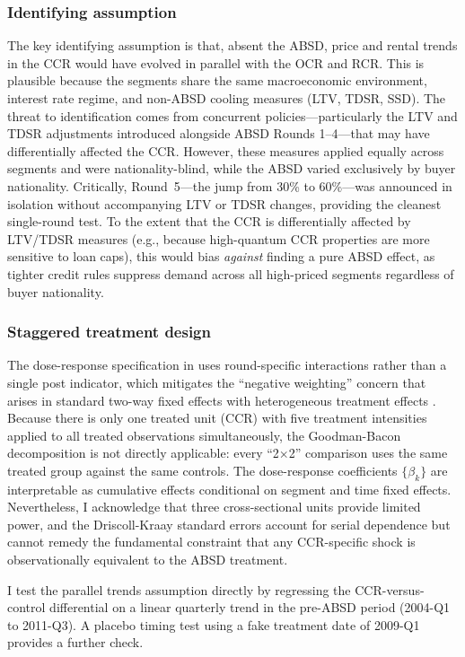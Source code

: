 \documentclass[12pt]{article}
\begin{document}
\subsubsection*{Identifying assumption} The key identifying assumption is that, absent the ABSD, price and rental trends in the CCR would have evolved in parallel with the OCR and RCR. This is plausible because the segments share the same macroeconomic environment, interest rate regime, and non-ABSD cooling measures (LTV, TDSR, SSD). The threat to identification comes from concurrent policies---particularly the LTV and TDSR adjustments introduced alongside ABSD Rounds 1--4---that may have differentially affected the CCR. However, these measures applied equally across segments and were nationality-blind, while the ABSD varied exclusively by buyer nationality. Critically, Round~5---the jump from 30\% to 60\%---was announced in isolation without accompanying LTV or TDSR changes, providing the cleanest single-round test. To the extent that the CCR is differentially affected by LTV/TDSR measures (e.g., because high-quantum CCR properties are more sensitive to loan caps), this would bias \emph{against} finding a pure ABSD effect, as tighter credit rules suppress demand across all high-priced segments regardless of buyer nationality.

\subsubsection*{Staggered treatment design} The dose-response specification in  uses round-specific interactions rather than a single post indicator, which mitigates the ``negative weighting'' concern that arises in standard two-way fixed effects with heterogeneous treatment effects \citep{CallawayS2021}. Because there is only one treated unit (CCR) with five treatment intensities applied to all treated observations simultaneously, the Goodman-Bacon decomposition is not directly applicable: every ``2$\times$2'' comparison uses the same treated group against the same controls. The dose-response coefficients $\{\beta_k\}$ are interpretable as cumulative effects conditional on segment and time fixed effects. Nevertheless, I acknowledge that three cross-sectional units provide limited power, and the Driscoll-Kraay standard errors account for serial dependence but cannot remedy the fundamental constraint that any CCR-specific shock is observationally equivalent to the ABSD treatment.

I test the parallel trends assumption directly by regressing the CCR-versus-control differential on a linear quarterly trend in the pre-ABSD period (2004-Q1 to 2011-Q3). A placebo timing test using a fake treatment date of 2009-Q1 provides a further check.
\end{document}
